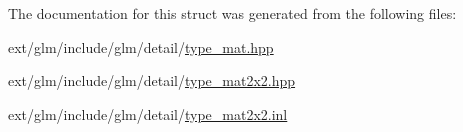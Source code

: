 The documentation for this struct was generated from the following files\-:\begin{DoxyCompactItemize}
\item 
ext/glm/include/glm/detail/\hyperlink{type__mat_8hpp}{type\-\_\-mat.\-hpp}\item 
ext/glm/include/glm/detail/\hyperlink{type__mat2x2_8hpp}{type\-\_\-mat2x2.\-hpp}\item 
ext/glm/include/glm/detail/\hyperlink{type__mat2x2_8inl}{type\-\_\-mat2x2.\-inl}\end{DoxyCompactItemize}
